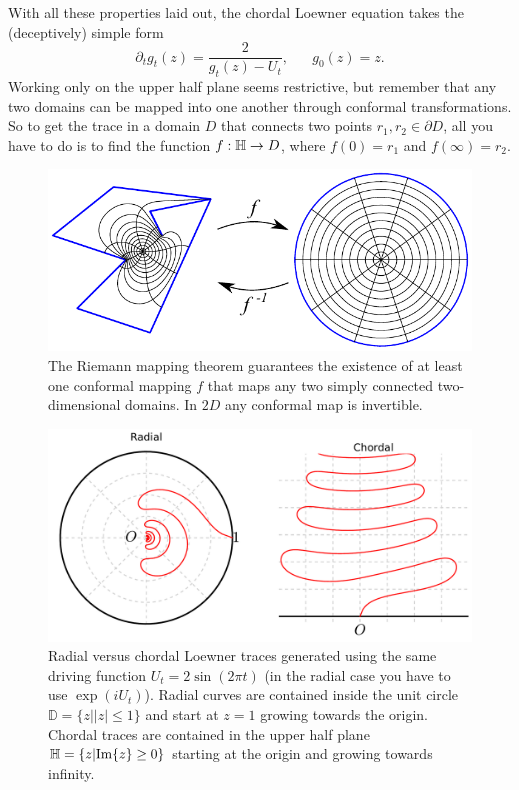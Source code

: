 With all these properties laid out, the chordal Loewner equation takes the
(deceptively) simple form
\begin{equation}
    \label{eq:loew}
    \partial_t g_t(z) = \frac{2}{g_t(z) - U_t}
    ,\,\,\,\,\,\,\,\,\,\,
    g_0(z)=z.
\end{equation}
Working only on the upper half plane seems restrictive, but remember that any
two domains can be mapped into one another through conformal transformations.
So to get the trace in a domain $D$ that connects two points $r_1, r_2 \in
\partial D$, all you have to do is to find the function $f:\mathbb{H}\rightarrow D$,
where $f(0)=r_1$ and $f(\infty)=r_2$.

\begin{figure}
\begin{center}
    \includegraphics[scale=1.0]{chapters/ch4-sle/figs/scmap}
\end{center}
\caption{The Riemann mapping theorem guarantees the existence of at least one
    conformal mapping $f$ that maps any two simply connected two-dimensional
    domains. In $2D$ any conformal map is invertible.}
\label{fig:scmap}
\end{figure}

\begin{figure}
\begin{center}
    \includegraphics[scale=0.4]{chapters/ch4-sle/figs/radchord}
\end{center}
\caption{Radial versus chordal Loewner traces generated using the same driving
    function $U_t=2\sin(2\pi t)$ (in the radial case you have to use
    $\exp(iU_t)$). Radial curves are contained inside the unit circle
    $\mathbb{D}=\{z||z|\leq1\}$ and start at $z=1$ growing towards the origin.
    Chordal traces are contained in the upper half plane
    $\mathbb{H}=\{z|\mbox{Im}\{z\}\geq0\}$ starting at the origin and growing towards
    infinity.}
\label{fig:radchord}
\end{figure}

